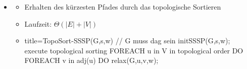 \documentclass[
    ngerman,
    color=3b,
    dark_mode,
    load_common, %
    summary,
    boxarc,
]{tuda_summary}
\begin{document}
\begin{itemize}
    \item {}
          \begin{itemize}
              \item Erhalten des kürzesten Pfades durch das topologische Sortieren
              \item Laufzeit: $\Theta(|E| + |V|)$
              \item[]%
                    \begin{codeBlock}[autogobble]{title={TopoSort-SSSP(G,s,w)    // G muss dag sein}}
                    initSSSP(G,s,w);
                    execute topological sorting
                    FOREACH u in V in topological order DO
                        FOREACH v in adj(u) DO
                            relax(G,u,v,w);
                    \end{codeBlock}
          \end{itemize}


\end{itemize}
\end{document}
